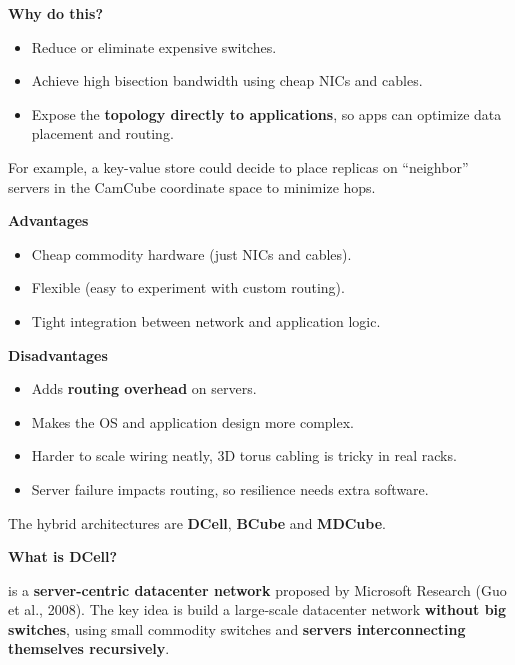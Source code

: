 \highspace
\textcolor{Green3}{ \textbf{Why do this?}}
\begin{itemize}
    \item Reduce or eliminate expensive switches.
    \item Achieve high bisection bandwidth using cheap NICs and cables.
    \item Expose the \textbf{topology directly to applications}, so apps can optimize data placement and routing.
\end{itemize}
For example, a key-value store could decide to place replicas on ``neighbor'' servers in the CamCube coordinate space to minimize hops.

\highspace
\begin{flushleft}
    \textcolor{Green3}{ \textbf{Advantages}}
\end{flushleft}
\begin{itemize}
    \item Cheap commodity hardware (just NICs and cables).
    \item Flexible (easy to experiment with custom routing).
    \item Tight integration between network and application logic.
\end{itemize}

\newpage

\begin{flushleft}
    \textcolor{Red2}{ \textbf{Disadvantages}}
\end{flushleft}
\begin{itemize}
    \item Adds \textbf{routing overhead} on servers.
    \item Makes the OS and application design more complex.
    \item Harder to scale wiring neatly, 3D torus cabling is tricky in real racks.
    \item Server failure impacts routing, so resilience needs extra software.
\end{itemize}

\highspace
The hybrid architectures are \textbf{DCell}, \textbf{BCube} and \textbf{MDCube}.

\highspace
\begin{flushleft}
    \textcolor{Green3}{ \textbf{What is DCell?}}
\end{flushleft}
 is a \textbf{server-centric datacenter network} proposed by Microsoft Research (Guo et al., 2008). The key idea is build a large-scale datacenter network \textbf{without big switches}, using small commodity switches and \textbf{servers interconnecting themselves recursively}.

